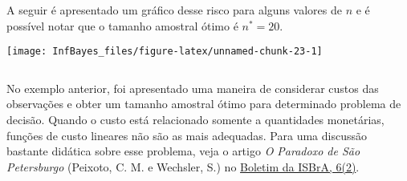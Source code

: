 \documentclass[
]{book}
\newenvironment{Shaded}{\begin{snugshade}}{\end{snugshade}}
\newcommand{\DataTypeTok}[1]{\textcolor[rgb]{0.13,0.29,0.53}{#1}}
\newcommand{\DecValTok}[1]{\textcolor[rgb]{0.00,0.00,0.81}{#1}}
\newcommand{\FloatTok}[1]{\textcolor[rgb]{0.00,0.00,0.81}{#1}}
\newcommand{\KeywordTok}[1]{\textcolor[rgb]{0.13,0.29,0.53}{\textbf{#1}}}
\newcommand{\NormalTok}[1]{#1}
\newcommand{\OperatorTok}[1]{\textcolor[rgb]{0.81,0.36,0.00}{\textbf{#1}}}
\newcommand{\StringTok}[1]{\textcolor[rgb]{0.31,0.60,0.02}{#1}}
\begin{document}
A seguir é apresentado um gráfico desse risco para alguns valores de \(n\) e é possível notar que o tamanho amostral ótimo é \({n}^*=20\).

\begin{Shaded}
\end{Shaded}

\begin{center}\texttt{[image: InfBayes\_files/figure-latex/unnamed-chunk-23-1]} \end{center}

\(~\)

No exemplo anterior, foi apresentado uma maneira de considerar custos das observações e obter um tamanho amostral ótimo para determinado problema de decisão. Quando o custo está relacionado somente a quantidades monetárias, funções de custo lineares não são as mais adequadas. Para uma discussão bastante didática sobre esse problema, veja o artigo \emph{O Paradoxo de São Petersburgo} (Peixoto, C. M. e Wechsler, S.) no \href{https://www.ime.usp.br/~isbra/boletim/boletim_2013_v06_n02.pdf}{Boletim da ISBrA, 6(2)}.
\end{document}
